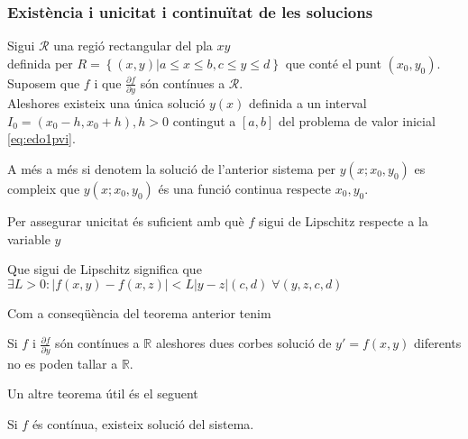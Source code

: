 \documentclass[../main.tex]{subfiles}
\begin{document}
\subsubsection{Existència i unicitat i continuïtat de les solucions}
\begin{teorema}
    Sigui $\mathcal{R}$ una regió rectangular del pla $xy$\\definida per $R = \left\{(x, y) | a \leq x \leq b, c \leq y \leq d\right\}$
    que conté el punt $(x_0, y_0)$.\\
    Suposem que $f$ i que $\frac{\partial f}{\partial y}$ són contínues a $\mathcal{R}$.\\
    Aleshores existeix una única solució $y(x)$ definida a un interval $I_0 = (x_0-h, x_0+h), h > 0$
    contingut a $\left[a, b\right]$ del problema de valor inicial \eqref{eq:edo1pvi}.

    A més a més si denotem la solució de l'anterior sistema per $y(x; x_0, y_0)$ es compleix que $y(x; x_0, y_0)$
    és una funció continua respecte $x_0, y_0$.
    \begin{obs}
        Per assegurar unicitat és suficient amb què $f$ sigui de Lipschitz respecte a la variable $y$
        \begin{obs}
            Que sigui de Lipschitz significa que $\exists L > 0: \left\lvert f(x,y) - f(x,z)\right\rvert < L \left\lvert y-z\right\rvert(c, d)\;\forall(y, z, c, d)$
        \end{obs}
    \end{obs}
\end{teorema}
Com a conseqüència del teorema anterior tenim
\begin{teorema}
	Si $f$ i $\frac{\partial f}{\partial y}$ són contínues a $\mathbb{R}$ aleshores dues corbes solució de $y' = f(x,y)$ diferents no es poden tallar a $\mathbb{R}$.
\end{teorema}
Un altre teorema útil és el seguent
\begin{teorema}[de Peano]
    Si $f$ és contínua, existeix solució del sistema.
\end{teorema}
\end{document}

